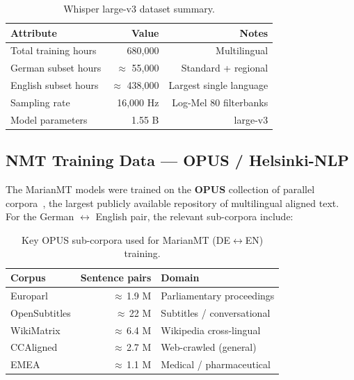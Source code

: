 \documentclass[12pt,a4paper]{report}
\begin{document}
\begin{table}[H]
  \centering
  \begin{tabular}{lrr}
    \toprule
    \textbf{Attribute} & \textbf{Value} & \textbf{Notes} \\
    \midrule
    Total training hours   & 680{,}000 & Multilingual \\
    German subset hours    & $\approx$ 55{,}000 & Standard + regional \\
    English subset hours   & $\approx$ 438{,}000 & Largest single language \\
    Sampling rate          & 16{,}000 Hz & Log-Mel 80 filterbanks \\
    Model parameters       & 1.55 B & large-v3 \\
    \bottomrule
  \end{tabular}
  \caption{Whisper large-v3 dataset summary.}
\end{table}

\subsection{NMT Training Data — OPUS / Helsinki-NLP}

The MarianMT models were trained on the \textbf{OPUS} collection of
parallel corpora~\cite{tiedemann2012parallel}, the largest publicly
available repository of multilingual aligned text. For the
German $\leftrightarrow$ English pair, the relevant sub-corpora include:

\begin{table}[H]
  \centering
  \begin{tabular}{lrl}
    \toprule
    \textbf{Corpus} & \textbf{Sentence pairs} & \textbf{Domain} \\
    \midrule
    Europarl        & $\approx$\,1.9 M & Parliamentary proceedings \\
    OpenSubtitles   & $\approx$\,22 M  & Subtitles / conversational \\
    WikiMatrix      & $\approx$\,6.4 M & Wikipedia cross-lingual \\
    CCAligned       & $\approx$\,2.7 M & Web-crawled (general) \\
    EMEA            & $\approx$\,1.1 M & Medical / pharmaceutical \\
    \bottomrule
  \end{tabular}
  \caption{Key OPUS sub-corpora used for MarianMT (DE$\leftrightarrow$EN) training.}
\end{table}
\end{document}
